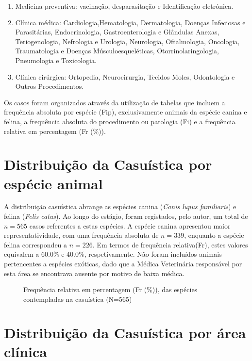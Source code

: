 \begin{enumerate}
    \item Medicina preventiva: vacinação, desparasitação e Identificação eletrónica.
    \item 	Clínica médica: Cardiologia,Hematologia, Dermatologia, Doenças Infeciosas e Parasitárias, Endocrinologia, Gastroenterologia e Glândulas Anexas, Teriogenologia, Nefrologia e Urologia, Neurologia, Oftalmologia, Oncologia, Traumatologia e Doenças Músculoesqueléticas, Otorrinolaringologia, Pneumologia e Toxicologia. 
    \item Clínica cirúrgica: Ortopedia, Neurocirurgia, Tecidos Moles, Odontologia e Outros Procedimentos.
\end{enumerate}

Os casos foram organizados através da utilização de tabelas que incluem a frequência absoluta por espécie (Fip), exclusivamente animais da espécie canina e felina, a frequência absoluta do procedimento ou patologia (Fi) e a frequência relativa em percentagem (Fr (\%)).

\section{Distribuição da Casuística por espécie animal}

A distribuição casuística abrange as espécies canina (\textit{Canis lupus familiaris}) e felina (\textit{Felis catus}). Ao longo do estágio, foram registados, pelo autor, um total de $n=565$ casos referentes a estas espécies. A espécie canina apresentou maior representatividade, com uma frequência absoluta de $n=339$, enquanto a espécie felina correspondeu a $n=226$. Em termos de frequência relativa(Fr), estes valores equivalem a 60.0\% e 40.0\%, respetivamente. Não foram incluídos animais pertencentes a espécies exóticas, dado que a Médica Veterinária responsável por esta área se encontrava ausente por motivo de baixa médica. 


\begin{figure}[h!]
  \centering
  \caption{Frequência relativa em percentagem (Fr (\%)), das espécies contempladas na 
casuística (N=565)}
  \label{fig:circular}
\end{figure}


\section{Distribuição da Casuística por área clínica}

